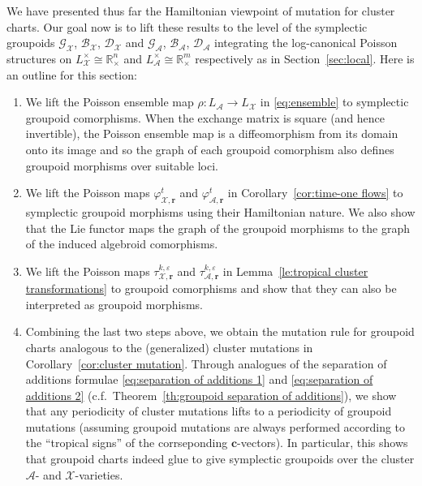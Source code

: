 \documentclass{amsart}
\numberwithin{equation}{section}
\newcommand{\bfc}{\mathbf{c}}
\newcommand{\bfr}{{\boldsymbol{r}}}
\newcommand{\cA}{\mathcal{A}}
\newcommand{\cB}{\mathcal{B}}
\newcommand{\cD}{\mathcal{D}}
\newcommand{\cG}{\mathcal{G}}
\newcommand{\cX}{\mathcal{X}}
\newcommand{\RR}{\mathbb{R}}
\begin{document}
We have presented thus far the Hamiltonian viewpoint of mutation for cluster charts.
Our goal now is to lift these results to the level of the symplectic groupoids $\cG_\cX$, $\cB_\cX$, $\cD_\cX$ and $\cG_\cA$, $\cB_\cA$, $\cD_\cA$ integrating the log-canonical Poisson structures on $L^\times_\cX\cong\RR_\times^n$ and $L^\times_\cA\cong\RR_\times^m$ respectively as in Section~\ref{sec:local}.
Here is an outline for this section:
\begin{enumerate}
  \item We lift the Poisson ensemble map $\rho:L_\cA\to L_\cX$ in \eqref{eq:ensemble} to symplectic groupoid comorphisms.
    When the exchange matrix is square (and hence invertible), the Poisson ensemble map is a diffeomorphism from its domain onto its image and so the graph of each groupoid comorphism also defines groupoid morphisms over suitable loci.
  \item We lift the Poisson maps $\varphi_{\cX,\bfr}^t$ and $\varphi_{\cA,\bfr}^t$ in Corollary~\ref{cor:time-one flows} to symplectic groupoid morphisms using their Hamiltonian nature.
    We also show that the Lie functor maps the graph of the groupoid morphisms to the graph of the induced algebroid comorphisms.
  \item We lift the Poisson maps $\tau_{\cX,\bfr}^{k,\varepsilon}$ and $\tau_{\cA,\bfr}^{k,\varepsilon}$ in Lemma~\ref{le:tropical cluster transformations} to groupoid comorphisms and show that they can also be interpreted as groupoid morphisms.
  \item Combining the last two steps above, we obtain the mutation rule for groupoid charts analogous to the (generalized) cluster mutations in Corollary~\ref{cor:cluster mutation}.
    Through analogues of the separation of additions formulae \eqref{eq:separation of additions 1} and \eqref{eq:separation of additions 2} (c.f.\ Theorem~\ref{th:groupoid separation of additions}), we show that any periodicity of cluster mutations lifts to a periodicity of groupoid mutations (assuming groupoid mutations are always performed according to the ``tropical signs'' of the corrseponding $\bfc$-vectors).
    In particular, this shows that groupoid charts indeed glue to give symplectic groupoids over the cluster $\cA$- and $\cX$-varieties.
\end{enumerate}
\end{document}
